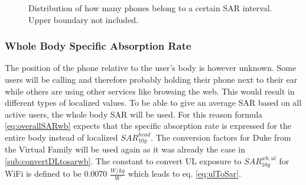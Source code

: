 

\begin{figure}
  \caption{Distribution of how many phones belong to a certain SAR interval. Upper boundary not included.}
  \label{chart:germanDatabase}
\end{figure}


\subsubsection{Whole Body Specific Absorption Rate}
The position of the phone relative to the user's body is however unknown. 
Some users will be calling and therefore probably holding their phone next to their ear while others are using other services like browsing the web. 
This would result in different types of localized values. To be able to give an average SAR based on all active users, the whole body SAR will be used.
For this reason formula \ref{eq:overallSARwb} expects that the specific absorption rate is expressed for the entire body instead of localized $SAR^{head}_{10g}$.
The conversion factors for Duke from the Virtual Family will be used again as it was already the case in \ref{sub:convertDLtosarwb}. 
The constant to convert \gls{UL} exposure to $SAR^{wb,ul}_{10g}$
for WiFi is defined to be 0.0070 $\frac{W/kg}{W}$ \cite{J22_plets2015joint} which leads to eq. \ref{eq:ulToSar}.

